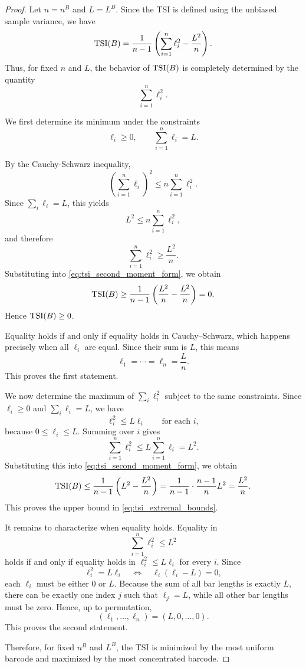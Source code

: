 \documentclass[11pt]{amsart}
\theoremstyle{definition}
\newcommand{\tsi}[0]{\textup{TSI}}
\begin{document}
\begin{proof}
Let $n=n^B$ and $L=L^B$. Since the TSI is defined using the unbiased sample variance, we have
\begin{equation}\label{eq:tsi_second_moment_form}
\tsi(B)=\frac{1}{n-1}\left(\sum_{i=1}^n \ell_i^2-\frac{L^2}{n}\right).
\end{equation}
Thus, for fixed $n$ and $L$, the behavior of $\tsi(B)$ is completely determined by the quantity
\[
\sum_{i=1}^n \ell_i^2.
\]

We first determine its minimum under the constraints
\[
\ell_i\geq 0,
\qquad
\sum_{i=1}^n \ell_i=L.
\]

By the Cauchy-Schwarz inequality,
\[
\left(\sum_{i=1}^n \ell_i\right)^2 \leq n\sum_{i=1}^n \ell_i^2.
\]
Since $\sum_i \ell_i=L$, this yields
\[
L^2\leq n\sum_{i=1}^n \ell_i^2,
\]
and therefore
\[
\sum_{i=1}^n \ell_i^2\geq \frac{L^2}{n}.
\]
Substituting into \eqref{eq:tsi_second_moment_form}, we obtain
\[
\tsi(B)\geq \frac{1}{n-1}\left(\frac{L^2}{n}-\frac{L^2}{n}\right)=0.
\]
Hence $\tsi(B)\geq 0$.

Equality holds if and only if equality holds in Cauchy--Schwarz, which happens precisely when all $\ell_i$ are equal. Since their sum is $L$, this means
\[
\ell_1=\cdots=\ell_n=\frac{L}{n}.
\]
This proves the first statement.

We now determine the maximum of $\sum_i \ell_i^2$ subject to the same constraints. Since $\ell_i\geq 0$ and $\sum_i \ell_i=L$, we have
\[
\ell_i^2\leq L\ell_i
\qquad \text{for each } i,
\]
because $0\leq \ell_i\leq L$. Summing over $i$ gives
\[
\sum_{i=1}^n \ell_i^2 \leq L\sum_{i=1}^n \ell_i=L^2.
\]
Substituting this into \eqref{eq:tsi_second_moment_form}, we obtain
\[
\tsi(B)\leq \frac{1}{n-1}\left(L^2-\frac{L^2}{n}\right)
=\frac{1}{n-1}\cdot \frac{n-1}{n}L^2
=\frac{L^2}{n}.
\]
This proves the upper bound in \eqref{eq:tsi_extremal_bounds}.

It remains to characterize when equality holds. Equality in
\[
\sum_{i=1}^n \ell_i^2 \leq L^2
\]
holds if and only if equality holds in $\ell_i^2\leq L\ell_i$ for every $i$. Since
\[
\ell_i^2=L\ell_i
\quad \Longleftrightarrow \quad
\ell_i(\ell_i-L)=0,
\]
each $\ell_i$ must be either $0$ or $L$. Because the sum of all bar lengths is exactly $L$, there can be exactly one index $j$ such that $\ell_j=L$, while all other bar lengths must be zero. Hence, up to permutation,
\[
(\ell_1,\ldots,\ell_n)=(L,0,\ldots,0).
\]
This proves the second statement.

Therefore, for fixed $n^B$ and $L^B$, the TSI is minimized by the most uniform barcode and maximized by the most concentrated barcode.
\end{proof}
\end{document}
